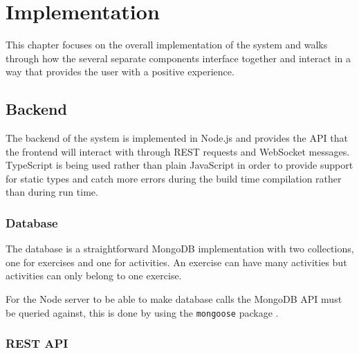 \chapter{Implementation}


This chapter focuses on the overall implementation of the system and walks through how the several separate components interface together and interact in a way that provides the user with a positive experience.

\section{Backend}

The backend of the system is implemented in Node.js and provides the API that the frontend will interact with through REST requests and WebSocket messages. TypeScript \cite{typescript} is being used rather than plain JavaScript in order to provide support for static types and catch more errors during the build time compilation rather than during run time.

\subsection{Database}

The database is a straightforward MongoDB \cite{mongo} implementation with two collections, one for exercises and one for activities. An exercise can have many activities but activities can only belong to one exercise.


For the Node server to be able to make database calls the MongoDB API must be queried against, this is done by using the \texttt{mongoose} package \cite{mongoose}.

\subsection{REST API} \label{impl-rest}

